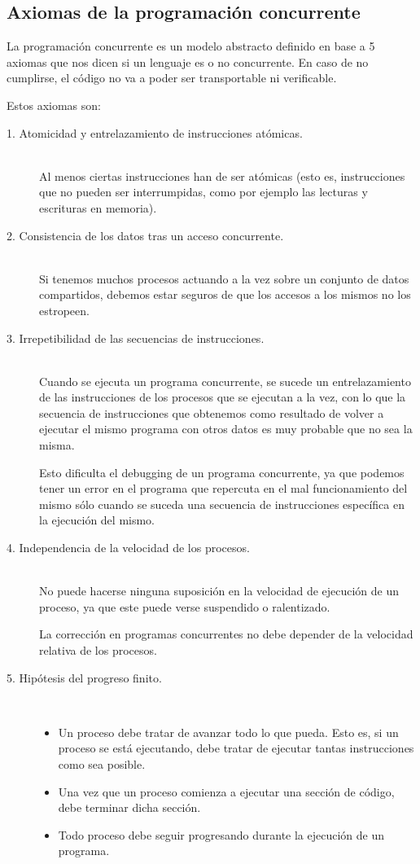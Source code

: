 \subsection{Axiomas de la programación concurrente}
La programación concurrente es un modelo abstracto definido en base a 5 axiomas que nos dicen si un lenguaje es o no concurrente. En caso de no cumplirse, el código no va a poder ser transportable ni verificable.

Estos axiomas son:
\begin{description}
    \item [1. Atomicidad y entrelazamiento de instrucciones atómicas.]~\\
        Al menos ciertas instrucciones han de ser atómicas (esto es, instrucciones que no pueden ser interrumpidas, como por ejemplo las lecturas y escrituras en memoria).
    \item [2. Consistencia de los datos tras un acceso concurrente.]~\\
        Si tenemos muchos procesos actuando a la vez sobre un conjunto de datos compartidos, debemos estar seguros de que los accesos a los mismos no los estropeen.
    \item [3. Irrepetibilidad de las secuencias de instrucciones.]~\\
        Cuando se ejecuta un programa concurrente, se sucede un entrelazamiento de las instrucciones de los procesos que se ejecutan a la vez, con lo que la secuencia de instrucciones que obtenemos como resultado de volver a ejecutar el mismo programa con otros datos es muy probable que no sea la misma.

        Esto dificulta el debugging de un programa concurrente, ya que podemos tener un error en el programa que repercuta en el mal funcionamiento del mismo sólo cuando se suceda una secuencia de instrucciones específica en la ejecución del mismo.
    \item [4. Independencia de la velocidad de los procesos.]~\\
        No puede hacerse ninguna suposición en la velocidad de ejecución de un proceso, ya que este puede verse suspendido o ralentizado.

        La corrección en programas concurrentes no debe depender de la velocidad relativa de los procesos.
    \item [5. Hipótesis del progreso finito.]~\\
        \begin{itemize}
            \item Un proceso debe tratar de avanzar todo lo que pueda. Esto es, si un proceso se está ejecutando, debe tratar de ejecutar tantas instrucciones como sea posible.
            \item Una vez que un proceso comienza a ejecutar una sección de código, debe terminar dicha sección.
            \item Todo proceso debe seguir progresando durante la ejecución de un programa.
        \end{itemize}
\end{description}

